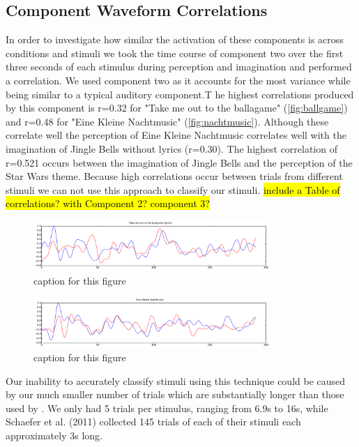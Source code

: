 \subsection*{Component Waveform Correlations}
In order to investigate how similar the activation of these components is across conditions and stimuli we took the time course of component two over the first three seconds of each stimulus during perception and imagination and performed a correlation.
We used component two as it accounts for the most variance while being similar to a typical auditory component.T
he highest correlations produced by this component is r=0.32 for "Take me out to the ballagame" (\autoref{fig:ballgame}) and r=0.48 for "Eine Kleine Nachtmusic" (\autoref{fig:nachtmusic}).
Although these correlate well the perception of Eine Kleine Nachtmusic correlates well with the imagination of Jingle Bells without lyrics (r=0.30). 
The highest correlation of r=0.521 occurs between the imagination of Jingle Bells and the perception of the Star Wars theme. 
Because high correlations occur between trials from different stimuli we can not use this approach to classify our stimuli.
\hl{include a Table of correlations? with Component 2? component 3?}

\begin{figure}[t]
  \begin{center}
    \includegraphics[width=0.8\textwidth,keepaspectratio=true]{Figures/component_timecourse_ballgame.pdf}
    \caption{
caption for this figure
}
    \label{fig:ballgame}
  \end{center}
\end{figure}

\begin{figure}[t]
  \begin{center}
    \includegraphics[width=0.8\textwidth,keepaspectratio=true]{Figures/component_timecourse_nachtmusic.pdf}
    \caption{
caption for this figure
}
    \label{fig:nachtmusic}
  \end{center}
\end{figure}

Our inability to accurately classify stimuli using this technique could be caused by our much smaller number of trials which are substantially longer than those used by \cite{schaefer_name_2011}. 
We only had 5 trials per stimulus, ranging from 6.9s to 16s, while Schaefer et al. (2011) collected 145 trials of each of their stimuli each approximately 3s long.